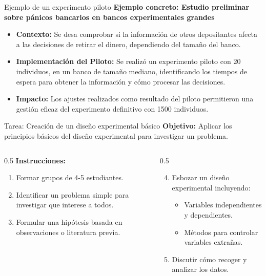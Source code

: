 ﻿\documentclass{beamer}
\begin{document}
\begin{frame}{Ejemplo de un experimento piloto}
\textbf{Ejemplo concreto: Estudio preliminar sobre pánicos bancarios en bancos experimentales grandes}
\begin{itemize}
    \item \textbf{Contexto:} Se desa comprobar si la información de otros depositantes afecta a las decisiones de retirar el dinero, dependiendo del tamaño del banco.
    \item \textbf{Implementación del Piloto:} Se realizó un experimento piloto con 20 individuos, en un banco de tamaño mediano, identificando los tiempos de espera para obtener la información y cómo procesar las decisiones.
    \item \textbf{Impacto:} Los ajustes realizados como resultado del piloto permitieron una gestión eficaz del experimento definitivo con 1500 individuos.
\end{itemize}
\end{frame}

\begin{frame}{Tarea: Creación de un diseño experimental básico}
    \textbf{Objetivo:} Aplicar los principios básicos del diseño experimental para investigar un problema.\\[10pt]
    
    \begin{columns}[T]
        \begin{column}{0.5\textwidth}
            \textbf{Instrucciones:}
            \begin{enumerate}
                \item Formar grupos de 4-5 estudiantes.
                \item Identificar un problema simple para investigar que interese a todos.
                \item Formular una hipótesis basada en observaciones o literatura previa.
            \end{enumerate}
        \end{column}
        \begin{column}{0.5\textwidth}
            \begin{enumerate}
                \setcounter{enumi}{3}
                \item Esbozar un diseño experimental incluyendo:
                \begin{itemize}
                    \item Variables independientes y dependientes.
                    \item Métodos para controlar variables extrañas.
                \end{itemize}
                \item Discutir cómo recoger y analizar los datos.
            \end{enumerate}
        \end{column}
    \end{columns}
    
\end{frame}
\end{document}
